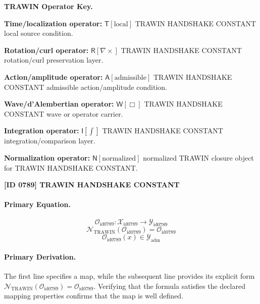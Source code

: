 \par\vspace{0.45\baselineskip}
\noindent\begin{minipage}[t]{\linewidth}
\begingroup
\small
\raggedright
\textbf{TRAWIN Operator Key.}\par
\noindent\textbf{Time/localization operator:} $\mathsf{T}\!\left[\mathrm{local}\right]$ TRAWIN HANDSHAKE CONSTANT local source condition.\par
\noindent\textbf{Rotation/curl operator:} $\mathsf{R}\!\left[\nabla\times\right]$ TRAWIN HANDSHAKE CONSTANT rotation/curl preservation layer.\par
\noindent\textbf{Action/amplitude operator:} $\mathsf{A}\!\left[\mathrm{admissible}\right]$ TRAWIN HANDSHAKE CONSTANT admissible action/amplitude condition.\par
\noindent\textbf{Wave/d'Alembertian operator:} $\mathsf{W}\!\left[\Box\right]$ TRAWIN HANDSHAKE CONSTANT wave or operator carrier.\par
\noindent\textbf{Integration operator:} $\mathsf{I}\!\left[\int\right]$ TRAWIN HANDSHAKE CONSTANT integration/comparison layer.\par
\noindent\textbf{Normalization operator:} $\mathsf{N}\!\left[\mathrm{normalized}\right]$ normalized TRAWIN closure object for TRAWIN HANDSHAKE CONSTANT.\par
\endgroup
\end{minipage}

\clearpage
\noindent\textbf{[ID 0789] TRAWIN HANDSHAKE CONSTANT}\par
\vspace{0.35em}
\paragraph{Primary Equation.}
\[
\mathcal{O}_{\mathrm{id0789}}:\mathcal{X}_{\mathrm{id0789}}\longrightarrow\mathcal{Y}_{\mathrm{id0789}}
\]
\[
\mathcal{N}_{\mathrm{TRAWIN}}(\mathcal{O}_{\mathrm{id0789}})=\mathcal{O}_{\mathrm{id0789}}
\]
\[
\mathcal{O}_{\mathrm{id0789}}(x)\in\mathcal{Y}_{\mathrm{adm}}
\]

\paragraph{Primary Derivation.}
The first line specifies a map, while the subsequent line provides its explicit form \( \mathcal{N}_{\mathrm{TRAWIN}}(\mathcal{O}_{\mathrm{id0789}})=\mathcal{O}_{\mathrm{id0789}} \). Verifying that the formula satisfies the declared mapping properties confirms that the map is well defined.
